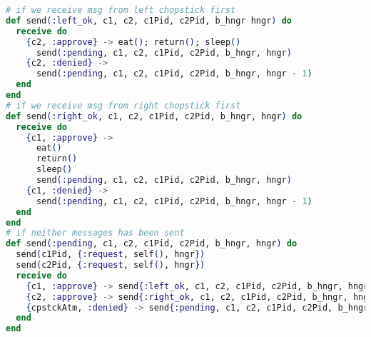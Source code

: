 \begin{lstlisting}[language=Elixir, title=Requesting for chopsticks in a decentralised environment]
# if we receive msg from left chopstick first
def send(:left_ok, c1, c2, c1Pid, c2Pid, b_hngr hngr) do
  receive do
    {c2, :approve} -> eat(); return(); sleep()
      send(:pending, c1, c2, c1Pid, c2Pid, b_hngr, hngr)
    {c2, :denied} ->
      send(:pending, c1, c2, c1Pid, c2Pid, b_hngr, hngr - 1)
  end
end
# if we receive msg from right chopstick first
def send(:right_ok, c1, c2, c1Pid, c2Pid, b_hngr, hngr) do
  receive do
    {c1, :approve} ->
      eat()
      return()
      sleep()
      send(:pending, c1, c2, c1Pid, c2Pid, b_hngr, hngr)
    {c1, :denied} ->
      send(:pending, c1, c2, c1Pid, c2Pid, b_hngr, hngr - 1)
  end
end
# if neither messages has been sent
def send(:pending, c1, c2, c1Pid, c2Pid, b_hngr, hngr) do
  send(c1Pid, {:request, self(), hngr})
  send(c2Pid, {:request, self(), hngr})
  receive do
    {c1, :approve} -> send{:left_ok, c1, c2, c1Pid, c2Pid, b_hngr, hngr}
    {c2, :approve} -> send{:right_ok, c1, c2, c1Pid, c2Pid, b_hngr, hngr}
    {cpstckAtm, :denied} -> send{:pending, c1, c2, c1Pid, c2Pid, b_hngr, hngr - 1}
  end
end
\end{lstlisting}